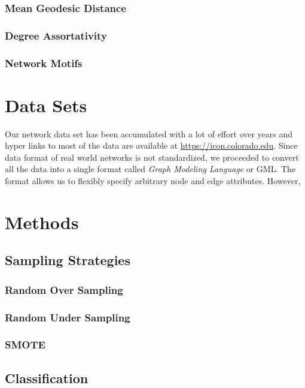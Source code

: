 \documentclass{article}
\begin{document}
	\subsubsection{Mean Geodesic Distance}
	\subsubsection{Degree Assortativity}
	\subsubsection{Network Motifs}



\section{Data Sets}
	
	Our network data set has been accumulated with a lot of effort over years and hyper links to most of the data are available at \url{https://icon.colorado.edu}.
	Since data format of real world networks is not standardized, we proceeded to convert all the data into a single format called \textit{Graph Modeling Language} or GML. The format allows us to flexibly specify arbitrary node and edge attributes. However, 
	
	

\section{Methods}

	\subsection{Sampling Strategies}
		\subsubsection{Random Over Sampling}
		\subsubsection{Random Under Sampling}
		\subsubsection{SMOTE}
	
	\subsection{Classification}
\end{document}
